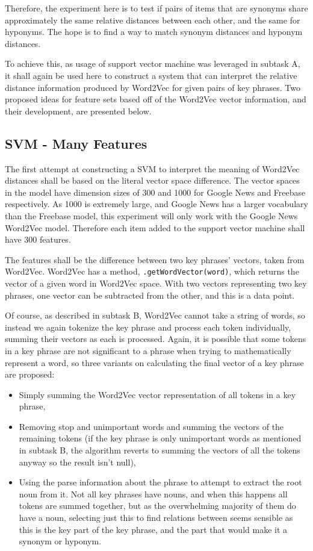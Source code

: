 Therefore, the experiment here is to test if pairs of items that are synonyms share approximately the same relative distances between each other, and the same for hyponyms. The hope is to find a way to match synonym distances and hyponym distances. 

To achieve this, as usage of support vector machine was leveraged in subtask A, it shall again be used here to construct a system that can interpret the relative distance information produced by Word2Vec for given pairs of key phrases. Two proposed ideas for feature sets based off of the Word2Vec vector information, and their development, are presented below.

\subsection{SVM - Many Features}
The first attempt at constructing a SVM to interpret the meaning of Word2Vec distances shall be based on the literal vector space difference. The vector spaces in the model have dimension sizes of 300 and 1000 for Google News and Freebase respectively. As 1000 is extremely large, and Google News has a larger vocabulary than the Freebase model, this experiment will only work with the Google News Word2Vec model. Therefore each item added to the support vector machine shall have 300 features. 

The features shall be the difference between two key phrases' vectors, taken from Word2Vec. Word2Vec has a method, \texttt{.getWordVector(word)}, which returns the vector of a given word in Word2Vec space. With two vectors representing two key phrases, one vector can be subtracted from the other, and this is a data point.

Of course, as described in subtask B, Word2Vec cannot take a string of words, so instead we again tokenize the key phrase and process each token individually, summing their vectors as each is processed. Again, it is possible that some tokens in a key phrase are not significant to a phrase when trying to mathematically represent a word, so three variants on calculating the final vector of a key phrase are proposed:
\begin{itemize}
	\item Simply summing the Word2Vec vector representation of all tokens in a key phrase,
	\item Removing stop and unimportant words and summing the vectors of the remaining tokens (if the key phrase is only unimportant words as mentioned in subtask B, the algorithm reverts to summing the vectors of all the tokens anyway so the result isn't null),
	\item Using the parse information about the phrase to attempt to extract the root noun from it. Not all key phrases have nouns, and when this happens all tokens are summed together, but as the overwhelming majority of them do have a noun, selecting just this to find relations between seems sensible as this is the key part of the key phrase, and the part that would make it a synonym or hyponym.
\end{itemize}


